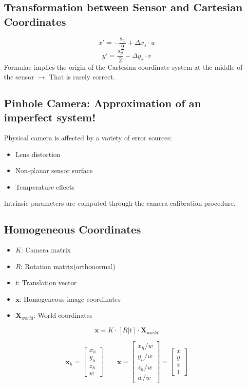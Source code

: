 \subsection{Transformation between Sensor and Cartesian Coordinates}
\[
x' = -\frac{s_x}{2} + \Delta x_s \cdot u
\]
\[
y' = \frac{s_y}{2} - \Delta y_s \cdot v
\]
Formulae implies the origin of the Cartesian coordinate system at the middle of the sensor \(\rightarrow\) That is rarely correct.

\subsection{Pinhole Camera: Approximation of an imperfect system!}
Physical camera is affected by a variety of error sources:
\begin{itemize}
    \item Lens distortion
    \item Non-planar sensor surface
    \item Temperature effects
\end{itemize}
Intrinsic parameters are computed through the camera calibration procedure.

\subsection{Homogeneous Coordinates}
\begin{itemize}
    \item \(K\): Camera matrix
    \item \(R\): Rotation matrix(orthonormal)
    \item \(t\): Translation vector
    \item \(\mathbf{x}\): Homogeneous image coordinates
    \item \(\mathbf{X}_{world}\): World coordinates
\end{itemize}
\[
\mathbf{x} = K \cdot [R | t] \cdot \mathbf{X}_{world}
\]


\[
\mathbf{x}_h =
\begin{bmatrix}
x_h \\
y_h \\
z_h \\
w
\end{bmatrix}
\qquad
\mathbf{x} =
\begin{bmatrix}
x_h / w \\
y_h / w \\
z_h / w \\
w / w
\end{bmatrix}
=
\begin{bmatrix}
x \\
y \\
z \\
1
\end{bmatrix}
\]

